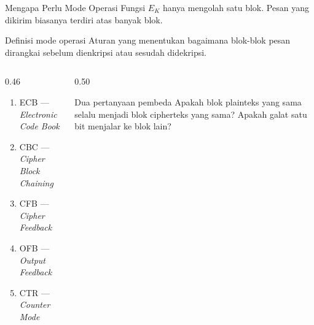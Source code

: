 \documentclass[aspectratio=169,11pt]{beamer}
\begin{document}
\begin{frame}{Mengapa Perlu Mode Operasi}
    \footnotesize
    Fungsi $E_K$ hanya mengolah satu blok. Pesan yang dikirim biasanya
    terdiri atas banyak blok.
    \begin{block}{Definisi mode operasi}
        Aturan yang menentukan bagaimana blok-blok pesan dirangkai
        sebelum dienkripsi atau sesudah didekripsi.
    \end{block}
    \begin{columns}[T,onlytextwidth]
        \begin{column}{0.46\textwidth}
            \begin{enumerate}
                \item ECB --- \textit{Electronic Code Book}
                \item CBC --- \textit{Cipher Block Chaining}
                \item CFB --- \textit{Cipher Feedback}
                \item OFB --- \textit{Output Feedback}
                \item CTR --- \textit{Counter Mode}
            \end{enumerate}
        \end{column}
        \begin{column}{0.50\textwidth}
            \begin{exampleblock}{Dua pertanyaan pembeda}
                \footnotesize
                Apakah blok plainteks yang sama selalu menjadi blok
                cipherteks yang sama? Apakah galat satu bit menjalar ke
                blok lain?
            \end{exampleblock}
        \end{column}
    \end{columns}
\end{frame}
\end{document}
